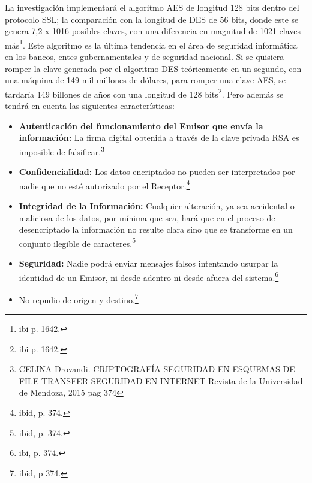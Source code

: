 \documentclass[a4paper,openright,12pt]{book}
\theoremstyle{definition}
\theoremstyle{remark}
\begin{document}
La investigación implementará el algoritmo AES de longitud 128 bits dentro del protocolo SSL; la comparación con la longitud de DES de 56 bits, donde este se genera 7,2 x 1016 posibles claves, con una diferencia en magnitud de 1021 claves más\footnote{ibi p. 1642.}. Este algoritmo es la última tendencia en el área de seguridad informática en los bancos, entes gubernamentales y de seguridad nacional. Si se quisiera romper la clave generada por el algoritmo DES teóricamente en un segundo, con una máquina de 149 mil millones de dólares, para romper una clave AES, se tardaría 149 billones de años con una longitud de 128 bits\footnote{ibi p. 1642.}. Pero además se tendrá en cuenta las siguientes características:
\begin{itemize}
\item \textbf{Autenticación del funcionamiento del Emisor que envía la información:} La firma digital obtenida a través de la clave privada RSA es imposible de falsificar.\footnote{CELINA Drovandi. CRIPTOGRAFÍA
SEGURIDAD EN ESQUEMAS DE FILE TRANSFER SEGURIDAD EN INTERNET Revista de la Universidad de Mendoza, 2015 pag 374}
\item \textbf{Confidencialidad:} Los datos encriptados no pueden ser interpretados por nadie que no esté autorizado por el Receptor.\footnote{ibid, p. 374.}
\item \textbf{Integridad de la Información:} Cualquier alteración, ya sea accidental o maliciosa de los datos, por mínima que sea, hará que en el proceso de desencriptado la información no resulte clara sino que se transforme en un conjunto ilegible de caracteres.\footnote{ibid, p. 374.}
\item \textbf{Seguridad:} Nadie podrá enviar mensajes falsos intentando usurpar la identidad de un Emisor, ni desde adentro ni desde afuera del sistema.\footnote{ibi, p. 374.}
\item No repudio de origen y destino.\footnote{ibid, p 374.}
\end{itemize}
\end{document}
